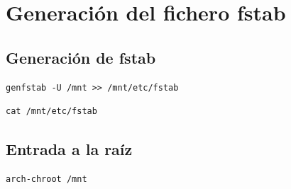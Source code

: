 \section{Generación del fichero fstab}


\subsection{Generación de {\ttfamily fstab}}

\begin{tcolorbox}[title=Generación de fstab]
    \begin{lstlisting}[style=bashstyle]
genfstab -U /mnt >> /mnt/etc/fstab
    \end{lstlisting}
\end{tcolorbox}
    
\begin{tcolorbox}[title=Comprobamos que se ha generado correctamente]
    \begin{lstlisting}[style=bashstyle]
cat /mnt/etc/fstab
    \end{lstlisting}
\end{tcolorbox}

\subsection{Entrada a la raíz}

  \begin{tcolorbox}[title=Y entramos en la partición {\ttfamily /mnt}]
    \begin{lstlisting}[style=bashstyle]
arch-chroot /mnt
    \end{lstlisting}
  \end{tcolorbox}
\newpage
